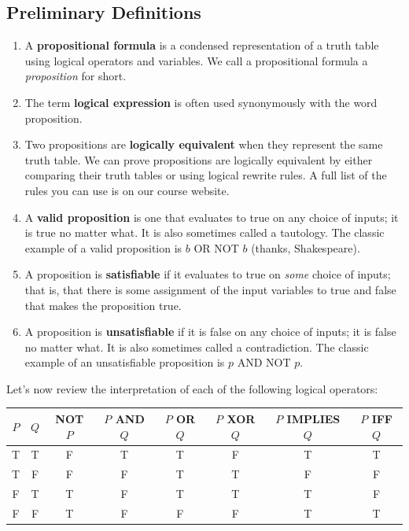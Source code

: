 \documentclass[12pt,letterpaper]{article}
\begin{document}
    \subsection{Preliminary Definitions}
    
    \begin{enumerate}
      
   	\item A \textbf{propositional formula} is a condensed representation of a truth table using logical operators and variables. We call a propositional formula a \textit{proposition} for short. 
	
	\item The term \textbf{logical expression} is often used synonymously with the word proposition. 
	
	\item Two propositions are \textbf{logically equivalent} when they represent the same truth table. We can prove propositions are logically equivalent by either comparing their truth tables or using logical rewrite rules. A full list of the rules you can use is on our course website.
	
	\item A \textbf{valid proposition} is one that evaluates to true on any choice of inputs; it is true no matter what. It is also sometimes called a tautology. The classic example of a valid proposition is $b$ OR NOT $b$ (thanks, Shakespeare). 
	
	\item A proposition is \textbf{satisfiable} if it evaluates to true on \textit{some} choice of inputs; that is, that there is some assignment of the input variables to true and false that makes the proposition true.
	
	\item A proposition is \textbf{unsatisfiable} if it is false on any choice of inputs; it is false no matter what. It is also sometimes called a contradiction. The classic example of an unsatisfiable proposition is $p$ AND NOT $p$. 
\end{enumerate}

Let's now review the interpretation of each of the following logical operators:    

\begin{tabular}{c|c|c|c|c|c|c|c}
 $P$ & $Q$ & NOT $P$ & $P$ AND $Q$ & $P$ OR $Q$ & $P$ XOR $Q$ & $P$ IMPLIES $Q$ & $P$ IFF $Q$\\
\hline
T & T & F & T & T & F & T & T\\
T & F & F & F & T & T & F & F\\
F & T & T & F & T & T & T & F\\
F & F & T & F & F & F & T & T
\end{tabular}
\end{document}
